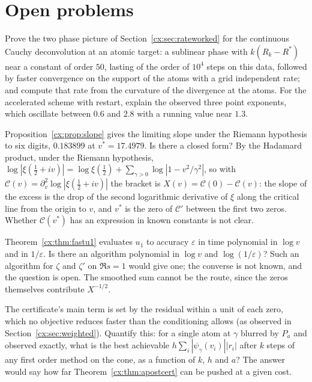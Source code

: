 \section{Open problems}\label{cx:sec:open}

\begin{problem}\label{cx:prob:twophase}
Prove the two phase picture of Section~\ref{cx:sec:rateworked} for the continuous Cauchy deconvolution at an atomic target: a sublinear phase with $k(R_k-R^*)$ near a constant of order $50$, lasting of the order of $10^4$ steps on this data, followed by faster convergence on the support of the atoms with a grid independent rate; and compute that rate from the curvature of the divergence at the atoms. For the accelerated scheme with restart, explain the observed three point exponents, which oscillate between $0.6$ and $2.8$ with a running value near $1.3$.
\end{problem}

\begin{problem}\label{cx:prob:closedform}
Proposition~\ref{cx:prop:slope} gives the limiting slope under the Riemann hypothesis to six digits, $0.183899$ at $v^*=17.4979$. Is there a closed form? By the Hadamard product, under the Riemann hypothesis, $\log|\xi(\tfrac12+iv)|=\log\xi(\tfrac12)+\sum_{\gamma>0}\log|1-v^2/\gamma^2|$, so with $\mathcal C(v)=\partial_v^2\log|\xi(\tfrac12+iv)|$ the bracket is $X(v)=\mathcal C(0)-\mathcal C(v)$: the slope of the excess is the drop of the second logarithmic derivative of $\xi$ along the critical line from the origin to $v$, and $v^*$ is the zero of $\mathcal C'$ between the first two zeros. Whether $\mathcal C(v^*)$ has an expression in known constants is not clear.
\end{problem}

\begin{problem}\label{cx:prob:polylog}
Theorem~\ref{cx:thm:fastu1} evaluates $u_1$ to accuracy $\varepsilon$ in time polynomial in $\log v$ and in $1/\varepsilon$. Is there an algorithm polynomial in $\log v$ and $\log(1/\varepsilon)$? Such an algorithm for $\zeta$ and $\zeta'$ on $\Re s=1$ would give one; the converse is not known, and the question is open. The smoothed sum cannot be the route, since the zeros themselves contribute $X^{-1/2}$.
\end{problem}

\begin{problem}\label{cx:prob:bestresidual}
The certificate's main term is set by the residual within a unit of each zero, which no objective reduces faster than the conditioning allows (as observed in Section~\ref{cx:sec:weighted}). Quantify this: for a single atom at $\gamma$ blurred by $P_a$ and observed exactly, what is the best achievable $h\sum_i|\psi_\gamma(v_i)||r_i|$ after $k$ steps of any first order method on the cone, as a function of $k$, $h$ and $a$? The answer would say how far Theorem~\ref{cx:thm:apostcert} can be pushed at a given cost.
\end{problem}
